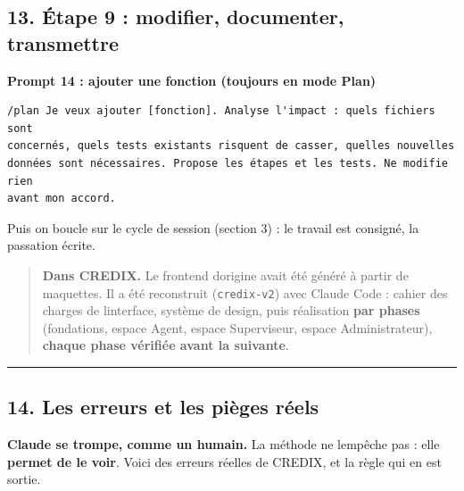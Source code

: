 \documentclass[
  french,
  11pt,
  a4paper,
]{article}
\begin{document}
\subsection{13. Étape 9 : modifier, documenter,
transmettre}\label{13-uxe9tape-9--modifier-documenter-transmettre}

\textbf{Prompt 14 : ajouter une fonction (toujours en mode Plan)}

\begin{Verbatim}[breaklines=true,breakanywhere=true,fontsize=\small,frame=leftline,framerule=1.6pt,rulecolor=\color{credixblue},framesep=3mm,xleftmargin=2mm,xrightmargin=1mm]
/plan Je veux ajouter [fonction]. Analyse l'impact : quels fichiers sont
concernés, quels tests existants risquent de casser, quelles nouvelles
données sont nécessaires. Propose les étapes et les tests. Ne modifie rien
avant mon accord.
\end{Verbatim}

Puis on boucle sur le cycle de session (section 3) : le travail est
consigné, la passation écrite.

\begin{quote}
\textbf{Dans CREDIX.} Le frontend d\textquotesingle origine avait été
généré à partir de maquettes. Il a été reconstruit (\texttt{credix-v2})
avec Claude Code : cahier des charges de l\textquotesingle interface,
système de design, puis réalisation \textbf{par phases} (fondations,
espace Agent, espace Superviseur, espace Administrateur), \textbf{chaque
phase vérifiée avant la suivante}.
\end{quote}

\begin{center}\rule{0.5\linewidth}{0.5pt}\end{center}

\subsection{14. Les erreurs et les pièges
réels}\label{14-les-erreurs-et-les-piuxe8ges-ruxe9els}

\textbf{Claude se trompe, comme un humain.} La méthode ne
l\textquotesingle empêche pas : elle \textbf{permet de le voir}. Voici
des erreurs réelles de CREDIX, et la règle qui en est sortie.
\end{document}
